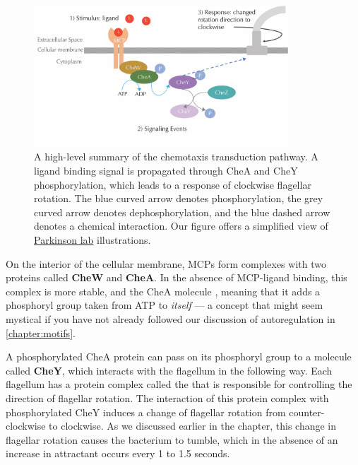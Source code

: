 \begin{figure}[h]
\centering
\mySfFamily
\includegraphics[width = 0.85\textwidth]{../images_CMYK/chemotaxisphosnew}
\caption{A high-level summary of the chemotaxis transduction pathway. A ligand binding signal is propagated through CheA and CheY phosphorylation, which leads to a response of clockwise flagellar rotation. The blue curved arrow denotes phosphorylation, the grey curved arrow denotes dephosphorylation, and the blue dashed arrow denotes a chemical interaction. Our figure offers a simplified view of \href{http://chemotaxis.biology.utah.edu/Parkinson_Lab/projects/ecolichemotaxis/ecolichemotaxis.html}{Parkinson lab} illustrations.}
\label{fig:chemotaxisphosnew}
\end{figure}


On the interior of the cellular membrane, MCPs form complexes with two proteins called \textbf{CheW} and \textbf{CheA}. In the absence of MCP-ligand binding, this complex is more stable, and the CheA molecule , meaning that it adds a phosphoryl group taken from ATP to \textit{itself} --- a concept that might seem mystical if you have not already followed our discussion of autoregulation in \autoref{chapter:motifs}.

A phosphorylated CheA protein can pass on its phosphoryl group to a molecule called \textbf{CheY}, which interacts with the flagellum in the following way. Each flagellum has a protein complex called the  that is responsible for controlling the direction of flagellar rotation. The interaction of this protein complex with phosphorylated CheY induces a change of flagellar rotation from counter-clockwise to clockwise. As we discussed earlier in the chapter, this change in flagellar rotation causes the bacterium to tumble, which in the absence of an increase in attractant occurs every 1 to 1.5 seconds.

